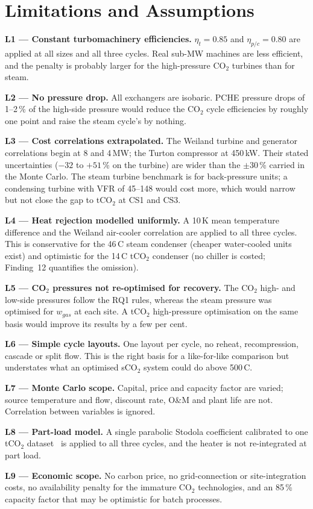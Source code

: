 \documentclass[12pt,a4paper]{report}
\begin{document}
\section{Limitations and Assumptions}
\label{sec:discussion_limitations}

\begin{limitbox}
\textbf{L1 --- Constant turbomachinery efficiencies.} $\eta_t = 0.85$ and
$\eta_{p/c} = 0.80$ are applied at all sizes and all three cycles. Real
sub-MW machines are less efficient, and the penalty is probably larger for
the high-pressure CO$_2$ turbines than for steam.

\textbf{L2 --- No pressure drop.} All exchangers are isobaric. PCHE pressure
drops of 1--2\,\% of the high-side pressure would reduce the CO$_2$ cycle
efficiencies by roughly one point and raise the steam cycle's by nothing.

\textbf{L3 --- Cost correlations extrapolated.} The Weiland turbine and
generator correlations begin at 8 and 4\,MW; the Turton compressor at
450\,kW. Their stated uncertainties ($-32$ to $+51$\,\% on the turbine) are
wider than the $\pm30$\,\% carried in the Monte Carlo. The steam turbine
benchmark is for back-pressure units; a condensing turbine with VFR of
45--148 would cost more, which would narrow but not close the gap to tCO$_2$
at CS1 and CS3.

\textbf{L4 --- Heat rejection modelled uniformly.} A 10\,K mean temperature
difference and the Weiland air-cooler correlation are applied to all three
cycles. This is conservative for the 46\,\textdegree C steam condenser
(cheaper water-cooled units exist) and optimistic for the 14\,\textdegree C
tCO$_2$ condenser (no chiller is costed; Finding~12 quantifies the omission).

\textbf{L5 --- CO$_2$ pressures not re-optimised for recovery.} The CO$_2$
high- and low-side pressures follow the RQ1 rules, whereas the steam
pressure was optimised for $w_{gas}$ at each site. A tCO$_2$ high-pressure
optimisation on the same basis would improve its results by a few per cent.

\textbf{L6 --- Simple cycle layouts.} One layout per cycle, no reheat,
recompression, cascade or split flow. This is the right basis for a
like-for-like comparison but understates what an optimised sCO$_2$ system
could do above 500\,\textdegree C.

\textbf{L7 --- Monte Carlo scope.} Capital, price and capacity factor are
varied; source temperature and flow, discount rate, O\&M and plant life are
not. Correlation between variables is ignored.

\textbf{L8 --- Part-load model.} A single parabolic Stodola coefficient
calibrated to one tCO$_2$ dataset~\cite{Yang2024} is applied to all three
cycles, and the heater is not re-integrated at part load.

\textbf{L9 --- Economic scope.} No carbon price, no grid-connection or
site-integration costs, no availability penalty for the immature CO$_2$
technologies, and an 85\,\% capacity factor that may be optimistic for
batch processes.
\end{limitbox}
\end{document}
